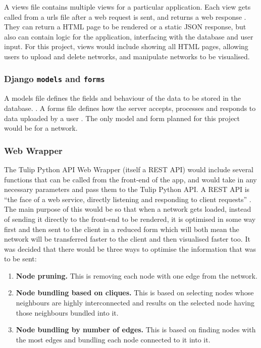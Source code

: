 \documentclass[../dissertation.tex]{subfiles}
\begin{document}
A views file contains multiple views for a particular application. Each view gets called from a urls file after a web request is sent, and returns a web response \cite{django-docs-views}. They can return a HTML page to be rendered or a static JSON response, but also can contain logic for the application, interfacing with the database and user input. For this project, views would include showing all HTML pages, allowing users to upload and delete networks, and manipulate networks to be visualised.

\subsubsection{Django \texttt{models} and \texttt{forms}}

A models file defines the fields and behaviour of the data to be stored in the database. \cite{django-docs-models}. A forms file defines how the server accepts, processes and responds to data uploaded by a user \cite{django-docs-forms}. The only model and form planned for this project would be for a network.

\subsubsection{Web Wrapper}

The Tulip Python API Web Wrapper (itself a REST API) would include several functions that can be called from the front-end of the app, and would take in any necessary parameters and pass them to the Tulip Python API. A REST API is ``the face of a web service, directly listening and responding to client requests'' \cite{masse2011rest}. The main purpose of this would be so that when a network gets loaded, instead of sending it directly to the front-end to be rendered, it is optimised in some way first and then sent to the client in a reduced form which will both mean the network will be transferred faster to the client and then visualised faster too. It was decided that there would be three ways to optimise the information that was to be sent:
\begin{enumerate}
    \item \textbf{Node pruning.} This is removing each node with one edge from the network.
    \item \textbf{Node bundling based on cliques.} This is based on selecting nodes whose neighbours are highly interconnected and results on the selected node having those neighbours bundled into it.
    \item \textbf{Node bundling by number of edges.} This is based on finding nodes with the most edges and bundling each node connected to it into it.
\end{enumerate}
\end{document}

